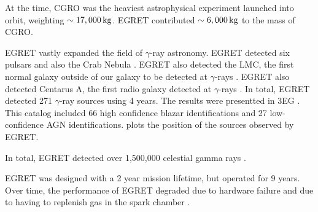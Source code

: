 At the time, \ac{CGRO} was the heaviest astrophysical experiment
launched into orbit, weighting $\sim17,000\,\text{kg}$. \ac{EGRET}
contributed $\sim6,000\,\text{kg}$ to the mass of \ac{CGRO}.

\ac{EGRET} vastly expanded the field of $\gamma$-ray astronomy.
\ac{EGRET} detected six pulsars \citep{nolan_1996a_egret-observations} and
also the Crab Nebula \cite{nolan_1993a_observations-pulsar}.  \ac{EGRET}
also detected the LMC, the first normal galaxy outside of our galaxy to
be detected at $\gamma$-rays \citep{sreekumar_1992a_observations-large}.
\ac{EGRET} also detected Centarus A, the first radio galaxy detected
at $\gamma$-rays \cite{sreekumar_1999a_emission-nearby}.  In total,
EGRET detected 271 $\gamma$-ray sources using 4 years.  The results were
presentted in \ac{3EG} \citep{hartman_1999a_third-egret}. This catalog
included 66 high confidence blazar identifications and 27 low-confidence
AGN identifications.  plots
the position of the sources observed by \ac{EGRET}.

In total, \ac{EGRET} detected over 1,500,000 celestial gamma rays \cite{thompson_2008a_gamma-astrophysics:}.

\ac{EGRET} was designed with a 2 year mission lifetime, but operated for 9 years.
Over time, the performance of \ac{EGRET} degraded due to hardware failure
and due to having to replenish gas in the spark chamber \cite{esposito_1999a_in-flight-calibration}.



